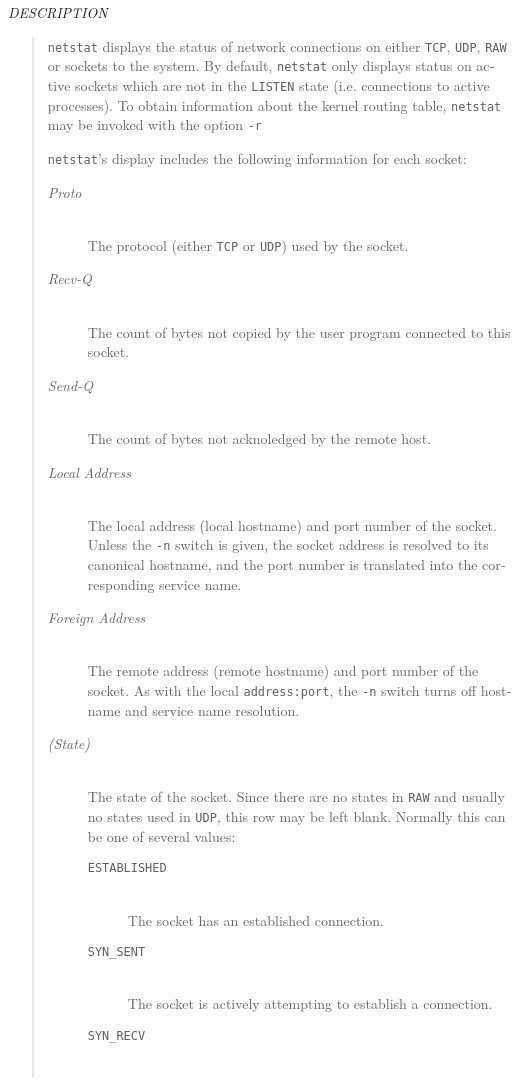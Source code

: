 \begin{appendix}
\begin{english}
{\sl DESCRIPTION}
\begin{quote}
	{\tt netstat} displays the status of network connections on
	either {\tt TCP}, {\tt UDP}, {\tt RAW} or {\Unix} sockets to 
	the system. By default, {\tt netstat} only displays status on
	active sockets which are not in the {\tt LISTEN} state (i.e. 
	connections to active processes). To obtain information about the
	kernel routing table, {\tt netstat} may be invoked with the option
	{\tt -r}

	{\tt netstat}'s display includes the following information for each
	socket:
	\begin{description}
		\item[{\sl Proto}]\mbox{}\\
			The protocol (either {\tt TCP} or {\tt UDP}) used by the socket.
		\item[{\sl Recv-Q}]\mbox{}\\
			The count of bytes not copied by the user program connected
			to this socket.
		\item[{\sl Send-Q}]\mbox{}\\
			The count of bytes not acknoledged by the remote host.
		\item[{\sl Local Address}]\mbox{}\\
			The local address (local hostname) and port number of the
			socket. Unless the {\tt -n} switch is given, the socket address
			is resolved to its canonical hostname, and the port number
			is translated into the corresponding service name.
		\item[{\sl Foreign Address}]\mbox{}\\
			The remote address (remote hostname) and port number of the
			socket. As with the local {\tt address:port}, the {\tt -n} switch
			turns off hostname and service name resolution.
		\item[{\sl (State)}]\mbox{}\\
			The state of the socket. Since there are no states in {\tt RAW}
			and usually no states used in {\tt UDP}, this row may be left
			blank. Normally this can be one of several values:
			\begin{description}
				\item[{\tt ESTABLISHED}]\mbox{}\\
					The socket has an established connection.
				\item[{\tt SYN\_SENT}]\mbox{}\\
					The socket is actively attempting to establish a
					connection.
				\item[{\tt SYN\_RECV}]\mbox{}\\

\end{description}
\end{description}
\end{quote}
\end{english}
\end{appendix}
